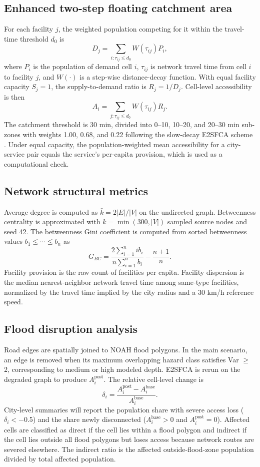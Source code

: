 \documentclass[9pt,twocolumn,twoside]{pnas-new}
\begin{document}
{\subsection*{Enhanced two-step floating catchment area}
For each facility $j$, the weighted population competing for it within the travel-time threshold $d_0$ is
\[
D_j=\sum_{i:\tau_{ij}\leq d_0}W(\tau_{ij})P_i,
\]
where $P_i$ is the population of demand cell $i$, $\tau_{ij}$ is network travel time from cell $i$ to facility $j$, and $W(\cdot)$ is a step-wise distance-decay function. With equal facility capacity $S_j=1$, the supply-to-demand ratio is $R_j=1/D_j$. Cell-level accessibility is then
\[
A_i=\sum_{j:\tau_{ij}\leq d_0}W(\tau_{ij})R_j.
\]
The catchment threshold is 30 min, divided into 0--10, 10--20, and 20--30 min sub-zones with weights 1.00, 0.68, and 0.22 following the slow-decay E2SFCA scheme \cite{luo2009}. Under equal capacity, the population-weighted mean accessibility for a city-service pair equals the service's per-capita provision, which is used as a computational check.

\subsection*{Network structural metrics}
Average degree is computed as $\bar{k}=2|E|/|V|$ on the undirected graph. Betweenness centrality is approximated with $k=\min(300,|V|)$ sampled source nodes and seed 42. The betweenness Gini coefficient is computed from sorted betweenness values $b_1\leq\cdots\leq b_n$ as
\[
G_{BC}=\frac{2\sum_{i=1}^{n}ib_i}{n\sum_{i=1}^{n}b_i}-\frac{n+1}{n}.
\]
Facility provision is the raw count of facilities per capita. Facility dispersion is the median nearest-neighbor network travel time among same-type facilities, normalized by the travel time implied by the city radius and a 30 km/h reference speed.

\subsection*{Flood disruption analysis}
Road edges are spatially joined to NOAH flood polygons. In the main scenario, an edge is removed when its maximum overlapping hazard class satisfies Var $\geq$ 2, corresponding to medium or high modeled depth. E2SFCA is rerun on the degraded graph to produce $A_i^{\mathrm{post}}$. The relative cell-level change is
\[
\delta_i=\frac{A_i^{\mathrm{post}}-A_i^{\mathrm{base}}}{A_i^{\mathrm{base}}}.
\]
City-level summaries will report the population share with severe access loss ($\delta_i < -0.5$) and the share newly disconnected ($A_i^{\mathrm{base}}>0$ and $A_i^{\mathrm{post}}=0$). Affected cells are classified as direct if the cell lies within a flood polygon and indirect if the cell lies outside all flood polygons but loses access because network routes are severed elsewhere. The indirect ratio is the affected outside-flood-zone population divided by total affected population.

}
\end{document}
